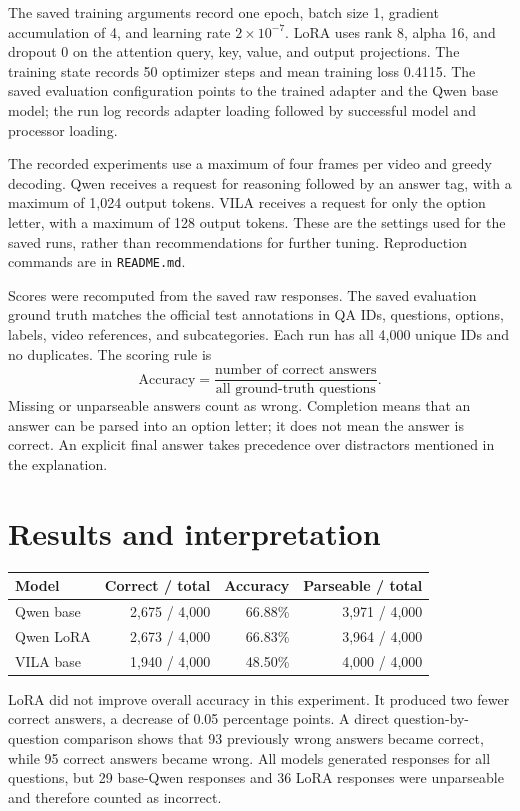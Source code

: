 \documentclass[11pt]{article}
\begin{document}
The saved training arguments record one epoch, batch size 1, gradient
accumulation of 4, and learning rate $2\times10^{-7}$. LoRA uses rank 8,
alpha 16, and dropout 0 on the attention query, key, value, and output
projections. The training state records 50 optimizer steps and mean training
loss 0.4115. The saved evaluation configuration points to the trained adapter
and the Qwen base model; the run log records adapter loading followed by
successful model and processor loading.

The recorded experiments use a maximum of four frames per video and greedy
decoding. Qwen receives a request for reasoning followed by an answer tag,
with a maximum of 1,024 output tokens. VILA receives a request for only the
option letter, with a maximum of 128 output tokens. These are the settings
used for the saved runs, rather than recommendations for further tuning.
Reproduction commands are in \texttt{README.md}.

Scores were recomputed from the saved raw responses. The saved evaluation
ground truth matches the official test annotations in QA IDs, questions,
options, labels, video references, and subcategories. Each run has all 4,000
unique IDs and no duplicates. The scoring rule is
\[
  \mathrm{Accuracy} =
  \frac{\text{number of correct answers}}{\text{all ground-truth questions}}.
\]
Missing or unparseable answers count as wrong. Completion means that an
answer can be parsed into an option letter; it does not mean the answer is
correct. An explicit final answer takes precedence over distractors mentioned
in the explanation.

\section{Results and interpretation}

\begin{center}
\begin{tabular}{lrrr}
\toprule
Model & Correct / total & Accuracy & Parseable / total \\
\midrule
Qwen base & 2,675 / 4,000 & 66.88\% & 3,971 / 4,000 \\
Qwen LoRA & 2,673 / 4,000 & 66.83\% & 3,964 / 4,000 \\
VILA base & 1,940 / 4,000 & 48.50\% & 4,000 / 4,000 \\
\bottomrule
\end{tabular}
\end{center}

LoRA did not improve overall accuracy in this experiment. It produced two
fewer correct answers, a decrease of 0.05 percentage points. A direct
question-by-question comparison shows that 93 previously wrong answers
became correct, while 95 correct answers became wrong. All models generated
responses for all questions, but 29 base-Qwen responses and 36 LoRA responses
were unparseable and therefore counted as incorrect.
\end{document}

